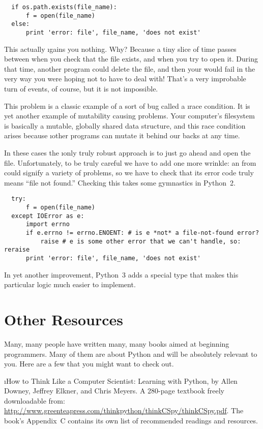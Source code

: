 \documentclass[letterpaper, 12pt, titlepage, twoside]{article}
\begin{document}
\begin{lstlisting}
  if os.path.exists(file_name):
      f = open(file_name)
  else:
      print 'error: file', file_name, 'does not exist'
\end{lstlisting}

This actually \i{gains you nothing}. Why? Because a tiny slice of time passes
between when you check that the file exists, and when you try to open it.
During that time, another program could delete the file, and then your
 would fail in the very way you were hoping not to have to deal
with! That's a very improbable turn of events, of course, but it is not
impossible.

This problem is a classic example of a sort of bug called a \i{race
  condition}. It is yet another example of mutability causing problems. Your
computer's filesystem is basically a mutable, globally shared data structure,
and this race condition arises because \i{other programs} can mutate it behind
our backs at any time.

In these cases the \i{only} truly robust approach is to just go ahead and open
the file. Unfortunately, to be truly careful we have to add one more wrinkle:
an  from  could signify a variety of problems, so we have
to check that its error code truly means ``file not found.'' Checking this
takes some gymnastics in Python~2.

\begin{lstlisting}
  try:
      f = open(file_name)
  except IOError as e:
      import errno
      if e.errno != errno.ENOENT: # is e *not* a file-not-found error?
          raise # e is some other error that we can't handle, so: reraise
      print 'error: file', file_name, 'does not exist'
\end{lstlisting}

In yet another improvement, Python~3 adds a special  type
that makes this particular logic much easier to implement.



\newpage
\section*{Other Resources}

Many, many people have written many, many books aimed at beginning
programmers. Many of them are about Python and will be absolutely relevant to
you. Here are a few that you might want to check out.

\i{How to Think Like a Computer Scientist: Learning with Python}, by Allen
Downey, Jeffrey Elkner, and Chris Meyers. A 280-page textbook freely
downloadable from:
\url{http://www.greenteapress.com/thinkpython/thinkCSpy/thinkCSpy.pdf}. The
book's Appendix~C contains its own list of recommended readings and resources.
\end{document}
